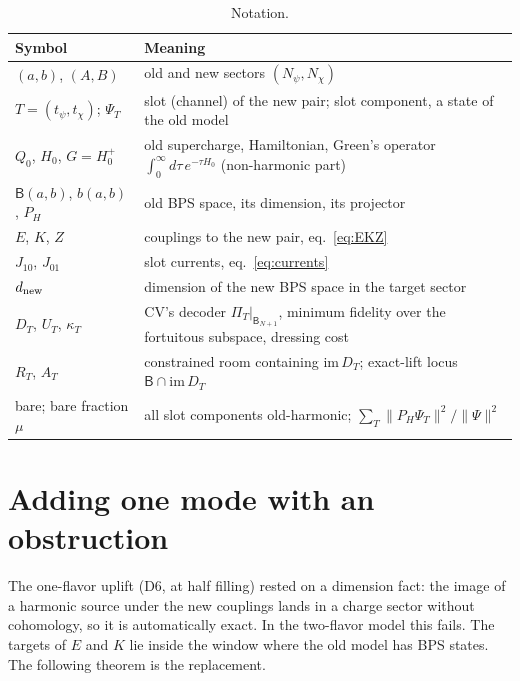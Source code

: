 \documentclass[11pt]{article}
\newcommand{\B}{\mathsf B}
\newcommand{\PH}{P_{\!H}}
\newcommand{\dnew}{d_{\rm new}}
\theoremstyle{plain}
\theoremstyle{remark}
\numberwithin{equation}{section}
\begin{document}
\begin{table}[ht]
\centering\small
\caption{Notation.}\label{tab:notation}
\begin{tabular}{@{}>{\raggedright\arraybackslash}p{}>{\raggedright\arraybackslash}p{}@{}}\toprule
Symbol & Meaning\\\midrule
$(a,b)$, $(A,B)$ & old and new sectors $(N_\psi,N_\chi)$\\
$T=(t_\psi,t_\chi)$; $\Psi_T$ & slot (channel) of the new pair; slot component, a state of the old model\\
$Q_0$, $H_0$, $G=H_0^+$ & old supercharge, Hamiltonian, Green's operator $\int_0^\infty\!d\tau\,e^{-\tau H_0}$ (non-harmonic part)\\
$\B(a,b)$, $b(a,b)$, $\PH$ & old BPS space, its dimension, its projector\\
$E$, $K$, $Z$ & couplings to the new pair, eq.~\eqref{eq:EKZ}\\
$J_{10}$, $J_{01}$ & slot currents, eq.~\eqref{eq:currents}\\
$\dnew$ & dimension of the new BPS space in the target sector\\
$D_T$, $U_T$, $\kappa_T$ & CV's decoder $\Pi_T|_{\B_{N+1}}$, minimum fidelity over the fortuitous subspace, dressing cost\\
$R_T$, $A_T$ & constrained room containing $\mathrm{im}\,D_T$; exact-lift locus $\B\cap\mathrm{im}\,D_T$\\
bare; bare fraction $\mu$ & all slot components old-harmonic; $\sum_T\|\PH\Psi_T\|^2/\|\Psi\|^2$\\\bottomrule
\end{tabular}
\end{table}

\section{Adding one mode with an obstruction}\label{sec:onemode}

The one-flavor uplift (D6, at half filling) rested on a dimension fact: the image of a harmonic source under the new
couplings lands in a charge sector without cohomology, so it is automatically exact. In the two-flavor model this fails. The targets of
$E$ and $K$ lie inside the window where the old model has BPS states. The following theorem is the replacement.
\end{document}
